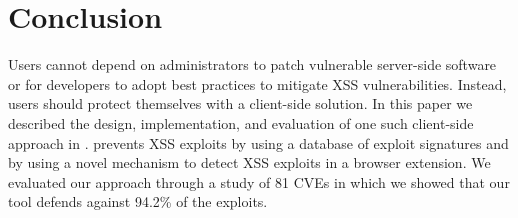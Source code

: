 \section{Conclusion}

Users cannot depend on administrators to patch vulnerable server-side
software or for developers to adopt best practices to mitigate XSS
vulnerabilities. Instead, users should protect themselves with a
client-side solution. In this paper we described the design,
implementation, and evaluation of one such client-side approach in
\sys.
%
\sys prevents \ac{XSS} exploits by using a database of exploit
signatures and by using a novel mechanism to detect XSS exploits in a
browser extension.
%
We evaluated our approach through a study of 81 CVEs in which we
showed that our tool defends against 94.2\% of the exploits.




